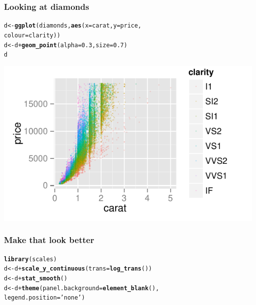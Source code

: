 \documentclass{beamer}\usepackage{graphicx, color}
\makeatletter
\def\maxwidth{ %
  \ifdim\Gin@nat@width>\linewidth
    \linewidth
  \else
    \Gin@nat@width
  \fi
}
\newcommand{\hlfunctioncall}[1]{\textcolor[rgb]{0.501960784313725,0,0.329411764705882}{\textbf{#1}}}%
\newcommand{\hlstring}[1]{\textcolor[rgb]{0.6,0.6,1}{#1}}%
\newenvironment{kframe}{%
 \def\at@end@of@kframe{}%
 \ifinner\ifhmode%
  \def\at@end@of@kframe{\end{minipage}}%
  \begin{minipage}{\columnwidth}%
 \fi\fi%
 \def\FrameCommand##1{\hskip\@totalleftmargin \hskip-\fboxsep
 \colorbox{shadecolor}{##1}\hskip-\fboxsep
     \hskip-\linewidth \hskip-\@totalleftmargin \hskip\columnwidth}%
 \MakeFramed {\advance\hsize-\width
   \@totalleftmargin\z@ \linewidth\hsize
   \@setminipage}}%
 {\par\unskip\endMakeFramed%
 \at@end@of@kframe}
\newenvironment{knitrout}{}{} %
\makeatother
\begin{document}
\begin{frame}[fragile]
  \frametitle{Looking at diamonds}
\begin{knitrout}
\color{fgcolor}\begin{kframe}
\begin{alltt}
d <- \hlfunctioncall{ggplot}(diamonds, \hlfunctioncall{aes}(x = carat, y = price, 
                          colour = clarity))
d <- d + \hlfunctioncall{geom_point}(alpha = 0.3, size = 0.7)
d
\end{alltt}
\end{kframe}
\includegraphics[width=\maxwidth]{figure/dia} 

\end{knitrout}


\end{frame}

\begin{frame}[fragile]
  \frametitle{Make that look better}
\begin{knitrout}
\color{fgcolor}\begin{kframe}
\begin{alltt}
\hlfunctioncall{library}(scales)
d <- d + \hlfunctioncall{scale_y_continuous}(trans = \hlfunctioncall{log_trans}())
d <- d + \hlfunctioncall{stat_smooth}()
d <- d + \hlfunctioncall{theme}(panel.background = \hlfunctioncall{element_blank}(),
               legend.position = \hlstring{'none'})
\end{alltt}
\end{kframe}
\end{knitrout}


\end{frame}
\end{document}
